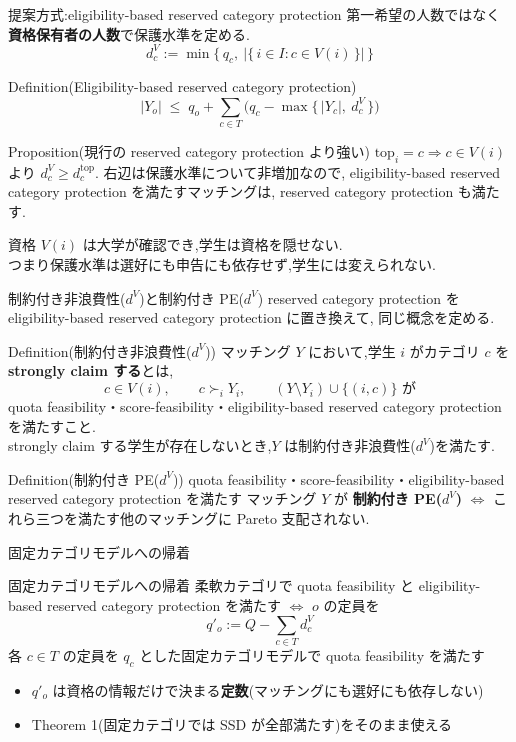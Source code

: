 \documentclass[aspectratio=43,11pt]{beamer}
\newcommand{\topf}{\mathrm{top}}
\newcommand{\dtop}[1]{d^{\topf}_{#1}}
\newcommand{\dV}[1]{d^{V}_{#1}}
\begin{document}
\begin{frame}{提案方式:eligibility-based reserved category protection}
\small
第一希望の人数ではなく\textbf{資格保有者の人数}で保護水準を定める.
\[
  \dV{c} := \min\bigl\{\, q_c,\ |\{\, i \in I : c \in V(i) \,\}| \,\bigr\}
\]
\begin{block}{Definition(Eligibility-based reserved category protection)}
  \[
    |Y_o| \;\leq\; q_o + \sum_{c \in T} \bigl( q_c - \max\{\, |Y_c|,\ \dV{c} \,\} \bigr)
  \]
\end{block}
\begin{block}{Proposition(現行の reserved category protection より強い)}
  $\topf_i = c \Rightarrow c \in V(i)$ より $\dV{c} \geq \dtop{c}$.
  右辺は保護水準について非増加なので,
  eligibility-based reserved category protection を満たすマッチングは,
  reserved category protection も満たす.
\end{block}
資格 $V(i)$ は大学が確認でき,学生は資格を隠せない.\\
つまり保護水準は選好にも申告にも依存せず,学生には変えられない.
\end{frame}

\begin{frame}{制約付き非浪費性($d^{V}$)と制約付き PE($d^{V}$)}
\small
reserved category protection を eligibility-based reserved category protection に置き換えて,
同じ概念を定める.
\begin{block}{Definition(制約付き非浪費性($d^{V}$))}
  マッチング $Y$ において,学生 $i$ がカテゴリ $c$ を \textbf{strongly claim する}とは,
  \[
    c \in V(i), \qquad c \succ_i Y_i, \qquad
    (Y \setminus Y_i) \cup \{(i,c)\} \text{ が}
  \]
  quota feasibility・score-feasibility・eligibility-based reserved category protection
  を満たすこと.
  \\ strongly claim する学生が存在しないとき,$Y$ は制約付き非浪費性($d^{V}$)を満たす.
\end{block}
\begin{block}{Definition(制約付き PE($d^{V}$))}
  quota feasibility・score-feasibility・eligibility-based reserved category protection を満たす
  マッチング $Y$ が \textbf{制約付き PE($d^{V}$)} $\iff$
  これら三つを満たす他のマッチングに Pareto 支配されない.
\end{block}
\end{frame}

\begin{frame}{固定カテゴリモデルへの帰着}
\begin{block}{固定カテゴリモデルへの帰着}
  柔軟カテゴリで quota feasibility と eligibility-based reserved category protection を満たす
  $\iff$
  $o$ の定員を
  \[
    q'_o := Q - \sum_{c \in T} \dV{c}
  \]
  各 $c \in T$ の定員を $q_c$ とした固定カテゴリモデルで quota feasibility を満たす
\end{block}
\begin{itemize}
  \item $q'_o$ は資格の情報だけで決まる\textbf{定数}(マッチングにも選好にも依存しない)
  \item \alert{Theorem 1(固定カテゴリでは SSD が全部満たす)をそのまま使える}
\end{itemize}
\end{frame}
\end{document}
